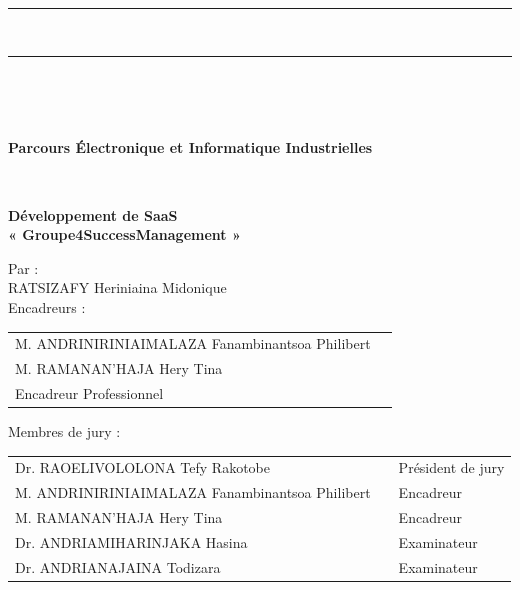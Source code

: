 \documentclass[12pt,a4paper]{report}
\begin{document}
\begin{titlepage}
{\begin{center}
 		\end{center}			
 	}\\
 	\vspace*{-0.7 cm}
 	\centering\parbox{\textwidth}{
 		\begin{center}
 			\color{black}\rule{\textwidth}{0.5pt}\\
 			\vspace*{-0.38 cm}
 			\rule{\textwidth}{1.5pt}\\	
 		\end{center}			
 	}\\
 	\centering\parbox{\textwidth}{
 		\begin{center}		
 			\large\textbf{Parcours Électronique et Informatique Industrielles} \\			
 		\end{center}			
 	}\\
 	\vfill
 	\parbox{\textwidth}{
 		\begin{center}
 			{\Huge \color[rgb]{0,0,1} \bfseries{ Développement de SaaS}} \\	
 			\vspace{0.3 cm}
 			{\Huge \color[rgb]{0,0,1} \bfseries{« Groupe4SuccessManagement »}} \\
 		\end{center}
 	}
 	\vfill
 	
 	\parbox{\textwidth}{
 		\begin{center}
 			\large{Par :}  \\
 			\vspace{0.3 cm}
 			\large{RATSIZAFY Heriniaina Midonique} \\
 			\vspace*{1 cm}
 			\large{Encadreurs :}\\
 			\vspace{0.3 cm}
 			\begin{tabular}{ll}
 				\normalsize M. ANDRINIRINIAIMALAZA Fanambinantsoa Philibert \\
 				\normalsize M. RAMANAN'HAJA Hery Tina \\
 				\normalsize Encadreur Professionnel\\				
 			\end{tabular}
 			
 			\vspace*{1 cm}
 			\large{Membres de jury :}\\
 			\vspace{0.3 cm}
 			\begin{tabular}{lll}
 				\normalsize Dr. RAOELIVOLOLONA Tefy Rakotobe & & \normalsize Président de jury\\
 				\normalsize M. ANDRINIRINIAIMALAZA Fanambinantsoa Philibert & & \normalsize Encadreur\\
 				\normalsize M. RAMANAN'HAJA Hery Tina & & \normalsize Encadreur\\
 				\normalsize Dr. ANDRIAMIHARINJAKA Hasina & & \normalsize Examinateur\\
 				\normalsize Dr. ANDRIANAJAINA Todizara & & \normalsize Examinateur\\			
 			\end{tabular}
 		\end{center}
 	}
 	

\end{titlepage}
\end{document}
